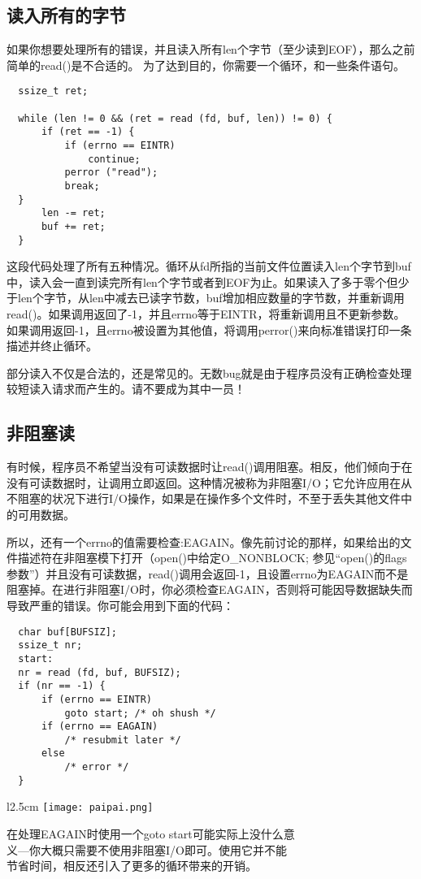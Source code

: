 \subsection{读入所有的字节}

如果你想要处理所有的错误，并且读入所有len个字节（至少读到EOF），那么之前简单的read()是不合适的。 为了达到目的，你需要一个循环，和一些条件语句。 

\begin{lstlisting}
  ssize_t ret;

  while (len != 0 && (ret = read (fd, buf, len)) != 0) {
      if (ret == -1) {
          if (errno == EINTR)
              continue;
          perror ("read");
          break;
  }
      len -= ret;
      buf += ret;
  }
\end{lstlisting}

这段代码处理了所有五种情况。循环从fd所指的当前文件位置读入len个字节到buf中，读入会一直到读完所有len个字节或者到EOF为止。如果读入了多于零个但少于len个字节，从len中减去已读字节数，buf增加相应数量的字节数，并重新调用read()。如果调用返回了-1，并且errno等于EINTR，将重新调用且不更新参数。如果调用返回-1，且errno被设置为其他值，将调用perror()来向标准错误打印一条描述并终止循环。

部分读入不仅是合法的，还是常见的。无数bug就是由于程序员没有正确检查处理较短读入请求而产生的。请不要成为其中一员！ 

\subsection{非阻塞读}

有时候，程序员不希望当没有可读数据时让read()调用阻塞。相反，他们倾向于在没有可读数据时，让调用立即返回。这种情况被称为非阻塞I/O；它允许应用在从不阻塞的状况下进行I/O操作，如果是在操作多个文件时，不至于丢失其他文件中的可用数据。

所以，还有一个errno的值需要检查:EAGAIN。像先前讨论的那样，如果给出的文件描述符在非阻塞模下打开（open()中给定O\_NONBLOCK; 参见“open()的flags参数”）并且没有可读数据，read()调用会返回-1，且设置errno为EAGAIN而不是阻塞掉。在进行非阻塞I/O时，你必须检查EAGAIN，否则将可能因导数据缺失而导致严重的错误。你可能会用到下面的代码： 

\begin{lstlisting}
  char buf[BUFSIZ];
  ssize_t nr;
  start:
  nr = read (fd, buf, BUFSIZ);
  if (nr == -1) {
      if (errno == EINTR)
          goto start; /* oh shush */
      if (errno == EAGAIN)
          /* resubmit later */
      else
          /* error */
  }
\end{lstlisting}
\par
\begin{wrapfigure}{l}{2.5cm}
\texttt{[image: paipai.png]}
\end{wrapfigure}
\mbox{}\begin{flushleft}在处理EAGAIN时使用一个goto start可能实际上没什么意\\义---你大概只需要不使用非阻塞I/O即可。使用它并不能\\节省时间，相反还引入了更多的循环带来的开销。\end{flushleft} 



